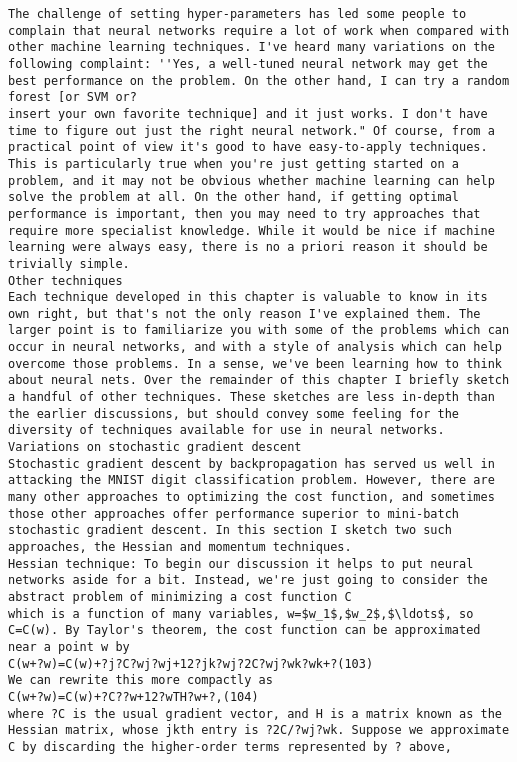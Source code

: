\begin{lstlisting}
The challenge of setting hyper-parameters has led some people to complain that neural networks require a lot of work when compared with other machine learning techniques. I've heard many variations on the following complaint: ''Yes, a well-tuned neural network may get the best performance on the problem. On the other hand, I can try a random forest [or SVM or?
insert your own favorite technique] and it just works. I don't have time to figure out just the right neural network." Of course, from a practical point of view it's good to have easy-to-apply techniques. This is particularly true when you're just getting started on a problem, and it may not be obvious whether machine learning can help solve the problem at all. On the other hand, if getting optimal performance is important, then you may need to try approaches that require more specialist knowledge. While it would be nice if machine learning were always easy, there is no a priori reason it should be trivially simple.
Other techniques
Each technique developed in this chapter is valuable to know in its own right, but that's not the only reason I've explained them. The larger point is to familiarize you with some of the problems which can occur in neural networks, and with a style of analysis which can help overcome those problems. In a sense, we've been learning how to think about neural nets. Over the remainder of this chapter I briefly sketch a handful of other techniques. These sketches are less in-depth than the earlier discussions, but should convey some feeling for the diversity of techniques available for use in neural networks.
Variations on stochastic gradient descent
Stochastic gradient descent by backpropagation has served us well in attacking the MNIST digit classification problem. However, there are many other approaches to optimizing the cost function, and sometimes those other approaches offer performance superior to mini-batch stochastic gradient descent. In this section I sketch two such approaches, the Hessian and momentum techniques.
Hessian technique: To begin our discussion it helps to put neural networks aside for a bit. Instead, we're just going to consider the abstract problem of minimizing a cost function C
which is a function of many variables, w=$w_1$,$w_2$,$\ldots$, so C=C(w). By Taylor's theorem, the cost function can be approximated near a point w by 
C(w+?w)=C(w)+?j?C?wj?wj+12?jk?wj?2C?wj?wk?wk+?(103)
We can rewrite this more compactly as 
C(w+?w)=C(w)+?C??w+12?wTH?w+?,(104)
where ?C is the usual gradient vector, and H is a matrix known as the Hessian matrix, whose jkth entry is ?2C/?wj?wk. Suppose we approximate C by discarding the higher-order terms represented by ? above, 

\end{lstlisting}
